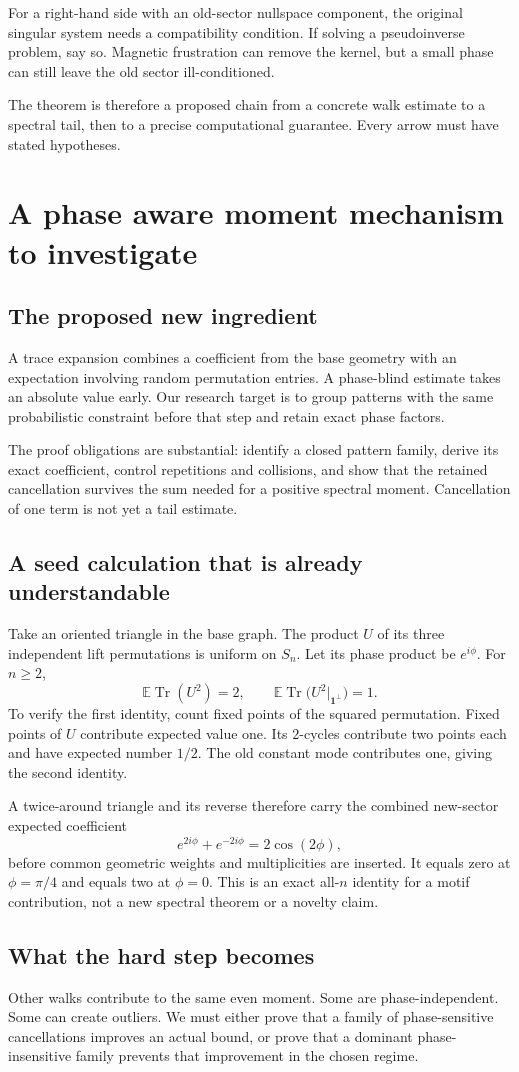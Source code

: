 \documentclass[11pt,letterpaper]{article}
\newcommand{\Page}[1]{\clearpage\section*{#1}}
\newcommand{\Sub}[1]{\subsection*{#1}}
\newcommand{\E}{\mathbb E}
\begin{document}
For a right-hand side with an old-sector nullspace component, the original singular system needs a compatibility condition. If solving a pseudoinverse problem, say so. Magnetic frustration can remove the kernel, but a small phase can still leave the old sector ill-conditioned.

The theorem is therefore a proposed chain from a concrete walk estimate to a spectral tail, then to a precise computational guarantee. Every arrow must have stated hypotheses.

\Page{A phase aware moment mechanism to investigate}

\Sub{The proposed new ingredient}
A trace expansion combines a coefficient from the base geometry with an expectation involving random permutation entries. A phase-blind estimate takes an absolute value early. Our research target is to group patterns with the same probabilistic constraint before that step and retain exact phase factors.

The proof obligations are substantial: identify a closed pattern family, derive its exact coefficient, control repetitions and collisions, and show that the retained cancellation survives the sum needed for a positive spectral moment. Cancellation of one term is not yet a tail estimate.

\Sub{A seed calculation that is already understandable}
Take an oriented triangle in the base graph. The product $U$ of its three independent lift permutations is uniform on $S_n$. Let its phase product be $e^{i\phi}$. For $n\geq2$,
\[
 \E\operatorname{Tr}(U^2)=2,
 \qquad
 \E\operatorname{Tr}\big(U^2|_{\mathbf1^\perp}\big)=1.
\]
To verify the first identity, count fixed points of the squared permutation. Fixed points of $U$ contribute expected value one. Its $2$-cycles contribute two points each and have expected number $1/2$. The old constant mode contributes one, giving the second identity.

A twice-around triangle and its reverse therefore carry the combined new-sector expected coefficient
\[
 e^{2i\phi}+e^{-2i\phi}=2\cos(2\phi),
\]
before common geometric weights and multiplicities are inserted. It equals zero at $\phi=\pi/4$ and equals two at $\phi=0$. This is an exact all-$n$ identity for a motif contribution, not a new spectral theorem or a novelty claim.

\Sub{What the hard step becomes}
Other walks contribute to the same even moment. Some are phase-independent. Some can create outliers. We must either prove that a family of phase-sensitive cancellations improves an actual bound, or prove that a dominant phase-insensitive family prevents that improvement in the chosen regime.
\end{document}
